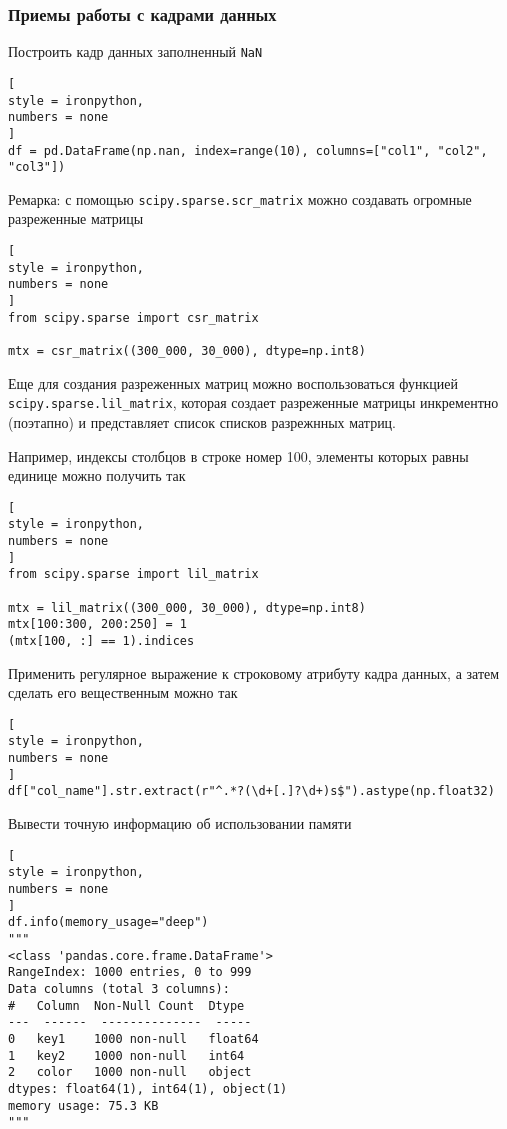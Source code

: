 \documentclass[%
	11pt,
	a4paper,
	utf8,
		]{article}
\begin{document}
\subsubsection{Приемы работы с кадрами данных}

Построить кадр данных заполненный \verb|NaN|
\begin{lstlisting}[
style = ironpython,
numbers = none
]
df = pd.DataFrame(np.nan, index=range(10), columns=["col1", "col2", "col3"])
\end{lstlisting}

Ремарка: с помощью \verb|scipy.sparse.scr_matrix| можно создавать огромные разреженные матрицы
\begin{lstlisting}[
style = ironpython,
numbers = none
]
from scipy.sparse import csr_matrix

mtx = csr_matrix((300_000, 30_000), dtype=np.int8)
\end{lstlisting} 

Еще для создания разреженных матриц можно воспользоваться функцией \verb|scipy.sparse.lil_matrix|, которая создает разреженные матрицы инкрементно (поэтапно) и представляет список списков разрежнных матриц.

Например, индексы столбцов в строке номер 100, элементы которых равны единице можно получить так
\begin{lstlisting}[
style = ironpython,
numbers = none
]
from scipy.sparse import lil_matrix

mtx = lil_matrix((300_000, 30_000), dtype=np.int8)
mtx[100:300, 200:250] = 1
(mtx[100, :] == 1).indices
\end{lstlisting}

Применить регулярное выражение к строковому атрибуту кадра данных, а затем сделать его вещественным можно так
\begin{lstlisting}[
style = ironpython,
numbers = none
]
df["col_name"].str.extract(r"^.*?(\d+[.]?\d+)s$").astype(np.float32)
\end{lstlisting}

Вывести точную информацию об использовании памяти
\begin{lstlisting}[
style = ironpython,
numbers = none	
]
df.info(memory_usage="deep")
"""
<class 'pandas.core.frame.DataFrame'>
RangeIndex: 1000 entries, 0 to 999
Data columns (total 3 columns):
#   Column  Non-Null Count  Dtype
---  ------  --------------  -----
0   key1    1000 non-null   float64
1   key2    1000 non-null   int64
2   color   1000 non-null   object
dtypes: float64(1), int64(1), object(1)
memory usage: 75.3 KB
"""
\end{lstlisting}
\end{document}
